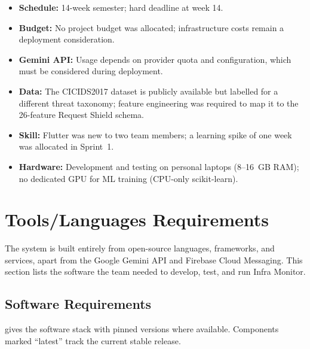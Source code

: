 \begin{itemize}
  \item \textbf{Schedule:} 14-week semester; hard deadline at week 14.
  \item \textbf{Budget:} No project budget was allocated; infrastructure costs
        remain a deployment consideration.
  \item \textbf{Gemini API:} Usage depends on provider quota and configuration,
        which must be considered during deployment.
  \item \textbf{Data:} The CICIDS2017 dataset is publicly available but labelled
        for a different threat taxonomy; feature engineering was required to map
        it to the 26-feature Request Shield schema.
  \item \textbf{Skill:} Flutter was new to two team members; a learning spike of
        one week was allocated in Sprint~1.
  \item \textbf{Hardware:} Development and testing on personal laptops
        (8--16~GB RAM); no dedicated GPU for ML training (CPU-only scikit-learn).
\end{itemize}

\section{Tools/Languages Requirements}

The system is built entirely from open-source languages, frameworks, and
services, apart from the Google Gemini API and Firebase Cloud Messaging.
This section lists the software the team needed to develop, test, and run
Infra Monitor.

\subsection{Software Requirements}

 gives the software stack with pinned versions where available.  Components marked ``latest'' track
the current stable release.

